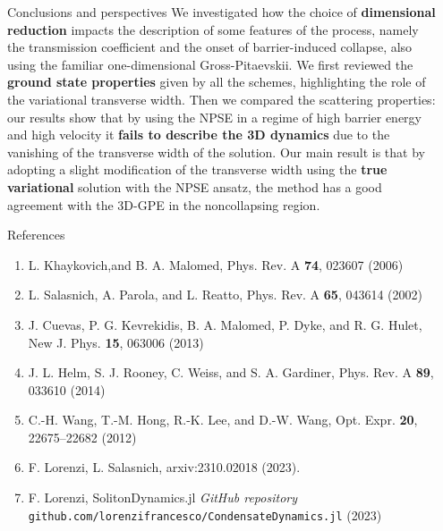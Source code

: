 \documentclass[final]{beamer}
\newlength{\sepwidth}
\newlength{\colwidth}
\newcommand{\separatorcolumn}{\begin{column}{\sepwidth}\end{column}}
\begin{document}
\begin{frame}[t]
\begin{columns}[t]
\begin{column}{\colwidth}
      \begin{block}{Conclusions and perspectives}
        We investigated how the choice of \textbf{dimensional reduction} impacts the description of some features of the process, namely the transmission coefficient and the onset of barrier-induced collapse, also using the familiar one-dimensional Gross-Pitaevskii. We first reviewed the \textbf{ground state properties} given by all the schemes, highlighting the role of the variational transverse width. Then we compared the scattering properties: our results show that by using the NPSE in a regime of high barrier energy and high velocity it \textbf{fails to describe the 3D dynamics} due to the vanishing of the transverse width of the solution. Our main result is that by adopting a slight modification of the transverse width using the \textbf{true variational} solution with the NPSE ansatz, the method has a good agreement with the 3D-GPE in the noncollapsing region.
      \end{block}
      \begin{block}{References}
        \printbibliography[heading=none]          
        \begin{enumerate}
            \item L. Khaykovich,and B. A. Malomed, Phys. Rev. A \textbf{74}, 023607 (2006)
            \item L. Salasnich, A. Parola, and L. Reatto, Phys. Rev. A \textbf{65}, 043614 (2002)
            \item J. Cuevas, P. G. Kevrekidis, B. A. Malomed, P. Dyke, and R. G. Hulet, New J. Phys. \textbf{15}, 063006 (2013)
            \item J. L. Helm, S. J. Rooney, C. Weiss, and S. A. Gardiner, Phys. Rev. A \textbf{89}, 033610 (2014)
            \item C.-H. Wang, T.-M. Hong, R.-K. Lee, and D.-W. Wang, Opt. Expr. \textbf{20}, 22675–22682 (2012)
            \item F. Lorenzi, L. Salasnich, arxiv:2310.02018 (2023).
            \item F. Lorenzi, SolitonDynamics.jl \textit{GitHub repository} \texttt{github.com/lorenzifrancesco/CondensateDynamics.jl} (2023)
        \end{enumerate}
      \end{block}

    \end{column}
    \separatorcolumn
  \end{columns}
\end{frame}
\end{document}
